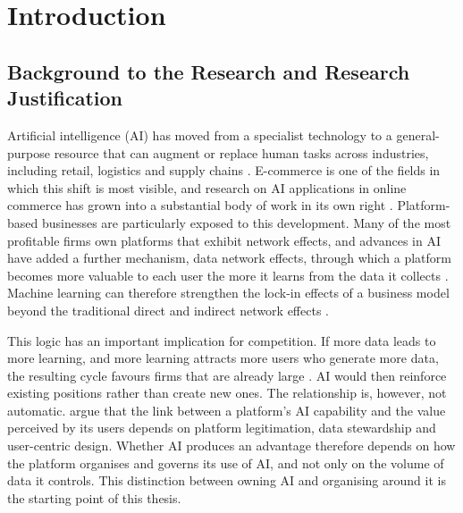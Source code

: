 %

\chapter{Introduction}
\label{ch:intro}

\section{Background to the Research and Research Justification}
\label{sec:background}

Artificial intelligence (AI) has moved from a specialist technology to a general-purpose resource that can augment or replace human tasks across industries, including retail, logistics and supply chains \parencite{dwivedi2021}. E-commerce is one of the fields in which this shift is most visible, and research on AI applications in online commerce has grown into a substantial body of work in its own right \parencite{bawack2022}. Platform-based businesses are particularly exposed to this development. Many of the most profitable firms own platforms that exhibit network effects, and advances in AI have added a further mechanism, data network effects, through which a platform becomes more valuable to each user the more it learns from the data it collects \parencite{gregory2021}. Machine learning can therefore strengthen the lock-in effects of a business model beyond the traditional direct and indirect network effects \parencite{haftor2021}.

This logic has an important implication for competition. If more data leads to more learning, and more learning attracts more users who generate more data, the resulting cycle favours firms that are already large \parencite{haftor2021}. AI would then reinforce existing positions rather than create new ones. The relationship is, however, not automatic. \textcite{gregory2021} argue that the link between a platform's AI capability and the value perceived by its users depends on platform legitimation, data stewardship and user-centric design. Whether AI produces an advantage therefore depends on how the platform organises and governs its use of AI, and not only on the volume of data it controls. This distinction between owning AI and organising around it is the starting point of this thesis.

